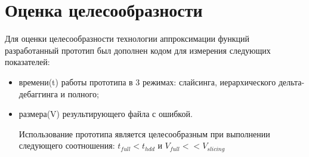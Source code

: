 \section{Оценка целесообразности}
Для оценки целесообразности технологии аппроксимации функ­ций разработанный прототип был дополнен кодом для измерения следующих показателей:
\begin{itemize}
	\item времени(t) работы прототипа в 3 режимах: слайсинга, иерархического дельта-дебаггинга и полного;
	\item размера(V) результирующего файла с ошибкой.
	
Использование прототипа является целесообразным при выполнении следующего соотношения: $t_{full} < t_{hdd}$ и $V_{full} << V_{slicing}$
\end{itemize}


